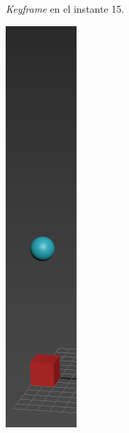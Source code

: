 \documentclass{article}
\begin{document}
\begin{figure}[H]
\begin{subfigure}[H]{0.15\textwidth}
	    \caption{\textit{Keyframe} en el instante 15.}
	\end{subfigure}
    \hfill
	\begin{subfigure}[H]{0.15\textwidth}
	    \centering
	    \includegraphics[width=\textwidth]{imagenes/Ejercicio 1/p1_ins25.png}

\end{subfigure}
\end{figure}
\end{document}
